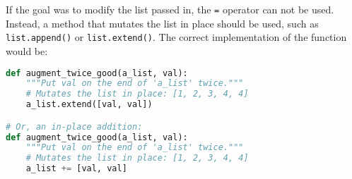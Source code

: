 If the goal was to modify the list passed in, the \texttt{=} operator can not be used. Instead, a method that mutates the list in place should be used, such as \texttt{list.append()} or \texttt{list.extend()}. The correct implementation of the function would be:

\begin{lstlisting}[language=Python, caption={Correct implementation of augment\_twice\_good}, label={lst:python-augment-twice-good}]
def augment_twice_good(a_list, val):
    """Put val on the end of 'a_list' twice."""
    # Mutates the list in place: [1, 2, 3, 4, 4]
    a_list.extend([val, val])

# Or, an in-place addition:
def augment_twice_good(a_list, val):
    """Put val on the end of 'a_list' twice."""
    # Mutates the list in place: [1, 2, 3, 4, 4]
    a_list += [val, val]
\end{lstlisting}